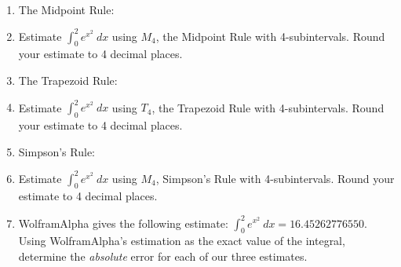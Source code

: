 \documentclass[11pt,fleqn]{article}
\begin{document}
\renewcommand{\headrulewidth}{0pt}
\newcommand{\blank}[1]{\rule{#1}{0.75pt}}
\newcommand{\bc}{\begin{center}}
\newcommand{\ec}{\end{center}}
\renewcommand{\d}{\displaystyle}

\vspace*{-0.7in}

\begin{center}
  \large
  \\
   
\end{center}

\begin{enumerate}
\item The Midpoint Rule:\\

\vspace{1in}

\item Estimate {\large{$\displaystyle{\int_0^2 e^{x^2} \: dx }$}} using $M_4$, the Midpoint Rule with 4-subintervals. Round your estimate to 4 decimal places.\\

\vfill

\item The Trapezoid Rule:\\

\vspace{1in}

\item Estimate {\large{$\displaystyle{\int_0^2 e^{x^2} \: dx }$}} using $T_4$, the Trapezoid Rule with 4-subintervals. Round your estimate to 4 decimal places.\\

\vfill
\newpage
\item Simpson's Rule:\\

\vspace{2in}

\item Estimate {\large{$\displaystyle{\int_0^2 e^{x^2} \: dx }$}} using $M_4$, Simpson's Rule with 4-subintervals. Round your estimate to 4 decimal places.\\

\vfill

\item WolframAlpha gives the following estimate: {\large{$\displaystyle{\int_0^2 e^{x^2} \: dx=16.45262776550}$}}. Using WolframAlpha's estimation as the exact value of the integral, determine the \emph{absolute} error for each of our three estimates.
\vfill
\end{enumerate}
\end{document}
